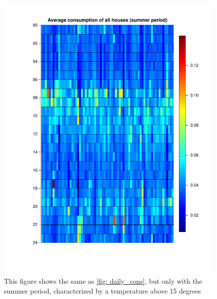 \begin{figure}
    \centering
    \includegraphics[width=\textwidth]{../../../figures/Heatmap_summer.pdf}
    \caption{This figure shows the same as \cref{fig: daily_cons}, but only with the summer period, characterized by a temperature above 15 degrees}
    \label{fig: Hourcons_summer}
\end{figure}

